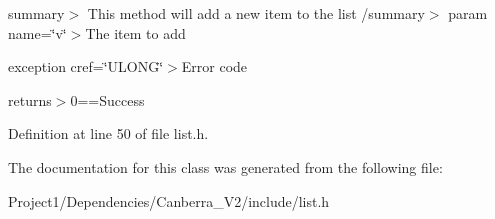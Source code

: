 summary$>$ This method will add a new item to the list /summary$>$ param name=\char`\"{}v\char`\"{}$>$The item to add

exception cref=\char`\"{}\+U\+L\+O\+N\+G\char`\"{}$>$Error code

returns$>$0==Success

Definition at line 50 of file list.\+h.



The documentation for this class was generated from the following file\+:\begin{DoxyCompactItemize}
\item 
Project1/\+Dependencies/\+Canberra\+\_\+\+V2/include/list.\+h\end{DoxyCompactItemize}

